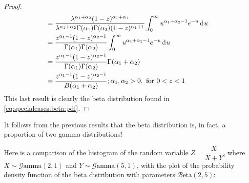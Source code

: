 \documentclass[12pt]{article}
\newcommand{\B}{\mathcal{B}}
\newcommand{\G}{\mathcal{G}}
\begin{document}
\begin{proof}
\begin{equation}
\begin{split}
					&=	\frac{\lambda^{\alpha_1+\alpha_2} (1-z)^{\alpha_1 + \alpha_1}}{\lambda^{\alpha_1+\alpha_2} \Gamma (\alpha _1) \Gamma (\alpha _2) (1-z)^{\alpha_1 +1}} \int_{0}^{\infty}  u^{\alpha_1 + \alpha_2 -1} e^{-u}\mathop{}\!\mathrm{d^{}}u\\
					&=	\frac{z^{\alpha_1 -1} (1-z)^{\alpha_2 -1}}{\Gamma (\alpha _1) \Gamma (\alpha _2)} \int_{0}^{\infty}  u^{\alpha_1 + \alpha_2 -1} e^{-u}\mathop{}\!\mathrm{d^{}}u\\
					&=	\frac{z^{\alpha_1 -1} (1-z)^{\alpha_2 -1}}{\Gamma (\alpha _1) \Gamma (\alpha _2)} \Gamma(\alpha_1 + \alpha_2)\\
					&=	\frac{z^{\alpha_1 -1} (1-z)^{\alpha_2 -1}}{B(\alpha_1 +\alpha_2)} ;\alpha _1,\alpha _2>0, \text{ for } 0<z<1\\
		\end{split}
	\end{equation}
	This last result is clearly the beta distribution found in \autoref{eq:specialcases:beta:pdf}.
\end{proof}

It follows from the previous results that the beta distribution is, in fact, a proportion of two gamma distributions!

Here is a comparison of the histogram of the random variable $Z=\dfrac{X}{X+Y}$, where $X\sim\G\text{amma}(2, 1)$ and
$Y\sim\G\text{amma}(5, 1)$, with the plot of the probability density function of the beta distribution with parameters
$\B\text{eta}(2,5)$:


\pagebreak
\end{document}
